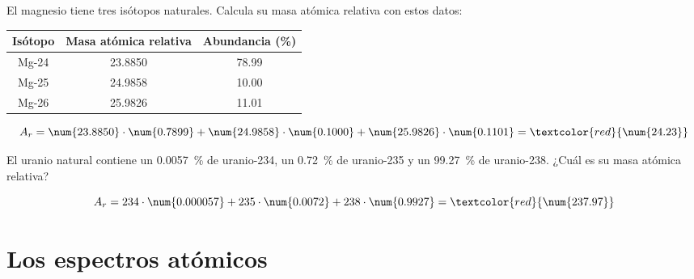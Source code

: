\begin{exercise}
    El magnesio tiene tres isótopos naturales. Calcula su masa atómica relativa con estos datos:
    \begin{center}
        \begin{tabular}{@{}ccc@{}}
            \toprule
            \textbf{Isótopo} & \textbf{Masa atómica relativa} & \textbf{Abundancia (\%)} \\
            \midrule
            Mg-24 & \num{23.8850} & \num{78.99} \\[3pt]
            Mg-25 & \num{24.9858} & \num{10.00} \\[3pt]
            Mg-26 & \num{25.9826} & \num{11.01} \\
            \bottomrule
        \end{tabular}
    \end{center}
    \begin{solu}
        \[ A_r = \num{23.8850}\cdot\num{0.7899} + \num{24.9858}\cdot\num{0.1000} + \num{25.9826}\cdot\num{0.1101} = \textcolor{red}{\num{24.23}} \]
    \end{solu}
\end{exercise}

\begin{exercise}
    El uranio natural contiene un \qty{0.0057}{\percent} de uranio-234, un \qty{0.72}{\percent} de uranio-235 y un \qty{99.27}{\percent} de uranio-238. ¿Cuál es su masa atómica relativa?
    \begin{solu}
        \[ A_r = 234\cdot\num{0.000057} + 235\cdot\num{0.0072} + 238\cdot\num{0.9927} = \textcolor{red}{\num{237.97}} \]
    \end{solu}
\end{exercise}

\section{Los espectros atómicos}

